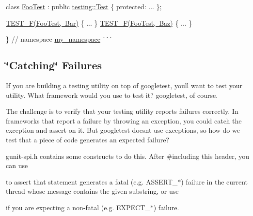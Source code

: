 \begin{DoxyItemize}
class \mbox{\hyperlink{class_foo_test}{Foo\+Test}} \+: public \mbox{\hyperlink{classtesting_1_1_test}{testing\+::\+Test}} \{ protected\+: ... \};

\mbox{\hyperlink{_obj__test_2lib_2googletest-release-1_88_81_2googletest_2include_2gtest_2gtest_8h_a0ee66d464d1a06c20c1929cae09d8758}{T\+E\+S\+T\+\_\+\+F(\+Foo\+Test, Bar)}} \{ ... \} \mbox{\hyperlink{_obj__test_2lib_2googletest-release-1_88_81_2googletest_2include_2gtest_2gtest_8h_a0ee66d464d1a06c20c1929cae09d8758}{T\+E\+S\+T\+\_\+\+F(\+Foo\+Test, Baz)}} \{ ... \}

\} // namespace \mbox{\hyperlink{namespacemy__namespace}{my\+\_\+namespace}} \`{}\`{}\`{}
\end{DoxyItemize}

\subsection*{\char`\"{}\+Catching\char`\"{} Failures}

If you are building a testing utility on top of googletest, you\textquotesingle{}ll want to test your utility. What framework would you use to test it? googletest, of course.

The challenge is to verify that your testing utility reports failures correctly. In frameworks that report a failure by throwing an exception, you could catch the exception and assert on it. But googletest doesn\textquotesingle{}t use exceptions, so how do we test that a piece of code generates an expected failure?

gunit-\/spi.\+h contains some constructs to do this. After \#including this header, you can use


\begin{DoxyCode}{0}
\end{DoxyCode}


to assert that {\ttfamily statement} generates a fatal (e.\+g. {\ttfamily A\+S\+S\+E\+R\+T\+\_\+$\ast$}) failure in the current thread whose message contains the given {\ttfamily substring}, or use


\begin{DoxyCode}{0}
\end{DoxyCode}


if you are expecting a non-\/fatal (e.\+g. {\ttfamily E\+X\+P\+E\+C\+T\+\_\+$\ast$}) failure.

